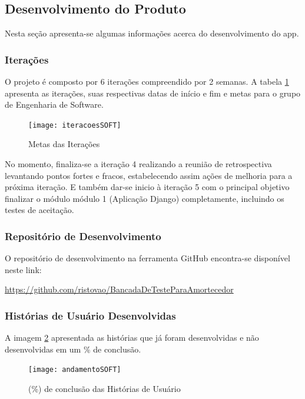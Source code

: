 \newpage
\newpage
\subsection{Desenvolvimento do Produto}
	
	Nesta seção apresenta-se algumas informações acerca do desenvolvimento do app.

	\subsubsection{Iterações}
		
		O projeto é composto por 6 iterações compreendido por 2 semanas. A tabela \ref{iteracoesSOFT} apresenta as iterações, suas respectivas datas de início e fim e metas para o grupo de Engenharia de Software.

		\begin{figure}[h]
			\centering
			\texttt{[image: iteracoesSOFT]}
			\caption{Metas das Iterações}
			\label{iteracoesSOFT}
		\end{figure}

		No momento, finaliza-se a iteração 4 realizando a reunião de retrospectiva levantando pontos fortes e fracos, estabelecendo assim ações de melhoria para a próxima iteração. E também dar-se inicio à iteração 5 com o principal objetivo finalizar o módulo módulo 1 (Aplicação Django) completamente, incluindo os testes de aceitação.

	\subsubsection{Repositório de Desenvolvimento}

		O repositório de desenvolvimento na ferramenta GitHub encontra-se disponível neste link:

		\href{https://github.com/ristovao/BancadaDeTesteParaAmortecedor}{https://github.com/ristovao/BancadaDeTesteParaAmortecedor}

	\subsubsection{Histórias de Usuário Desenvolvidas}

		A imagem \ref{andamentoSOFT} apresentada as histórias que já foram desenvolvidas e não desenvolvidas em um \% de conclusão.

		\newpage
		\begin{figure}[h]
			\centering
			\texttt{[image: andamentoSOFT]}
			\caption{(\%) de conclusão das Histórias de Usuário}
			\label{andamentoSOFT}
		\end{figure}

